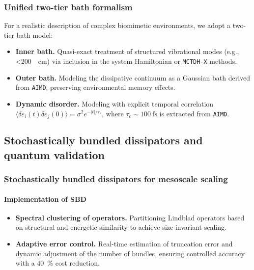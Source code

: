 \documentclass[12pt, a4paper]{article}
\begin{document}
\subsubsection{Unified two-tier bath formalism}

For a realistic description of complex biomimetic environments, we adopt a two-tier bath model:

\begin{itemize}
    \item \textbf{Inner bath.} Quasi-exact treatment of structured vibrational modes (e.g., \SI{<200}{\per\centi\meter}) via inclusion in the system Hamiltonian or \texttt{MCTDH-X} methods.
    
    \item \textbf{Outer bath.} Modeling the dissipative continuum as a Gaussian bath derived from \texttt{AIMD}, preserving environmental memory effects.
    
    \item \textbf{Dynamic disorder.} Modeling with explicit temporal correlation $\langle \delta \varepsilon_i(t) \delta \varepsilon_j(0) \rangle = \sigma^2 e^{-|t|/\tau_c}$, where $\tau_c \sim \SI{100}{\femto\second}$ is extracted from \texttt{AIMD}.
\end{itemize}

\subsection{Stochastically bundled dissipators and quantum validation}

\subsubsection{Stochastically bundled dissipators for mesoscale scaling}
\paragraph{Implementation of SBD}
\begin{itemize}
    \item \textbf{Spectral clustering of operators.} Partitioning Lindblad operators based on structural and energetic similarity to achieve size-invariant scaling.
    \item \textbf{Adaptive error control.} Real-time estimation of truncation error and dynamic adjustment of the number of bundles, ensuring controlled accuracy with a \SI{40}{\percent} cost reduction.
\end{itemize}
\end{document}
